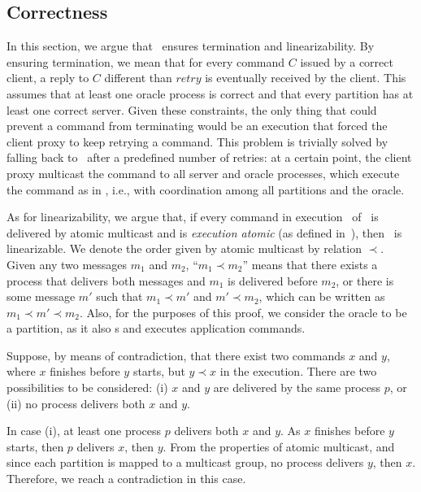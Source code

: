
\subsection{Correctness}
\label{sec:correctness}

In this section, we argue that \dssmr\ ensures termination and linearizability.
By ensuring termination, we mean that for every command $C$ issued by a correct client, a reply to $C$ different than $retry$ is eventually received by the client.
This assumes that at least one oracle process is correct and that every partition has at least one correct server.
Given these constraints, the only thing that could prevent a command from terminating would be an execution that forced the client proxy to keep retrying a command.
This problem is trivially solved by falling back to \ssmr\ after a predefined number of retries: at a certain point, the client proxy multicast the command to all server and oracle processes, which execute the command as in \ssmr{}, i.e., with coordination among all partitions and the oracle.

As for linearizability, we argue that, if every command in execution \ex\ of \dssmr\ is delivered by atomic multicast and is \emph{execution atomic} (as defined in~\cite{bezerra2014ssmr}), then \ex\ is linearizable.
We denote the order given by atomic multicast by relation $\prec$.
Given any two messages $m_1$ and $m_2$, ``$m_1 \prec m_2$'' means that there exists a process that delivers both messages and $m_1$ is delivered before $m_2$, or there is some message $m'$ such that $m_1 \prec m'$ and $m' \prec m_2$, which can be written as \mbox{$m_1 \prec m' \prec m_2$}.
Also, for the purposes of this proof, we consider the oracle to be a partition, as it also \amdel{}s and executes application commands.

Suppose, by means of contradiction, that there exist two commands $x$ and $y$, where $x$ finishes before $y$ starts, but $y \prec x$ in the execution.
There are two possibilities to be considered: (i) $x$ and $y$ are delivered by the same process $p$, or (ii) no process delivers both $x$ and $y$.

In case (i), at least one process $p$ delivers both $x$ and $y$.
As $x$ finishes before $y$ starts, then $p$ delivers $x$, then $y$. From the properties of atomic multicast, and since each partition is mapped to a multicast group, no process delivers $y$, then $x$.
Therefore, we reach a contradiction in this case.

